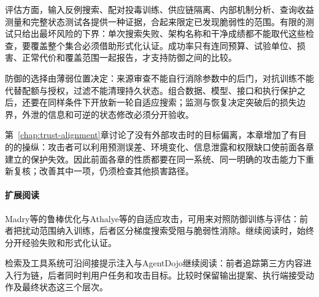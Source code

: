 评估方面，输入反例搜索、配对投毒训练、供应链隔离、内部机制分析、查询收益测量和完整状态测试各提供一种证据，合起来限定已发现脆弱性的范围。有限的测试只给出最坏风险的下界：单次搜索失败、架构名称和干净成绩都不能取代这些检查，要覆盖整个集合必须借助形式化认证。成功率只有连同预算、试验单位、损害、正常代价和覆盖范围一起报告，才支持防御之间的比较。

防御的选择由薄弱位置决定：来源审查不能自行消除参数中的后门，对抗训练不能代替配额与授权，过滤不能清理持久状态。组合数据、模型、接口和执行保护之后，还要在同样条件下开放新一轮自适应搜索；监测与恢复决定突破后的损失边界，外泄的信息和可逆的状态修改必须分开验收。

第~\ref{chap:trust-alignment}章讨论了没有外部攻击时的目标偏离，本章增加了有目的的操纵：攻击者可以利用预测误差、环境变化、信息泄露和权限缺口使前面各章建立的保护失效。因此前面各章的性质都要在同一系统、同一明确的攻击能力下重新复核；改善其中一项，仍须检查其他损害路径。

\paragraph{扩展阅读}

Madry等的鲁棒优化与Athalye等的自适应攻击，可用来对照防御训练与评估：前者把扰动范围纳入训练，后者区分梯度搜索受阻与脆弱性消除。继续阅读时，始终分开经验失败和形式化认证。

检索及工具系统可沿间接提示注入与AgentDojo继续阅读：前者追踪第三方内容进入行为链，后者同时判用户任务和攻击目标。比较时保留输出提案、执行端接受动作及最终状态这三个层次。
